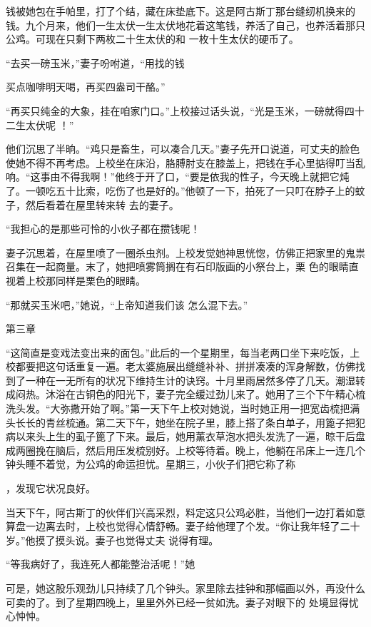 \documentclass{article}
\begin{document}
钱被她包在手帕里，打了个结，藏在床垫底下。这是阿古斯丁那台缝纫机换来的钱。九个月来，他们一生太伏一生太伏地花着这笔钱，养活了自己，也养活着那只公鸡。可现在只剩下两枚二十生太伏的和
一枚十生太伏的硬币了。 

“去买一磅玉米，”妻子吩咐道，“用找的钱

\newpage
买点咖啡明天喝，再买四盎司干酪。” 

“再买只纯金的大象，挂在咱家门口。”上校接过话头说，“光是玉米，一磅就得四十二生太伏呢
！” 

他们沉思了半晌。“鸡只是畜生，可以凑合几天。”妻子先开口说道，可丈夫的脸色使她不得不再考虑。上校坐在床沿，胳膊肘支在膝盖上，把钱在手心里掂得叮当乱响。“这事由不得我啊！”他终于开了口，“要是依我的性子，今天晚上就把它炖了。一顿吃五十比索，吃伤了也是好的。”他顿了一下，拍死了一只叮在脖子上的蚊子，然后看着在屋里转来转
去的妻子。 

“我担心的是那些可怜的小伙子都在攒钱呢！

妻子沉思着，在屋里喷了一圈杀虫剂。上校发觉她神思恍惚，仿佛正把家里的鬼祟召集在一起商量。末了，她把喷雾筒搁在有石印版画的小祭台上，栗
色的眼睛直视着上校那同样是栗色的眼睛。 

\newpage

“那就买玉米吧，”她说，“上帝知道我们该
怎么混下去。” 



第三章 

“这简直是变戏法变出来的面包。”此后的一个星期里，每当老两口坐下来吃饭，上校都要把这句话重复一遍。老太婆施展出缝缝补补、拼拼凑凑的浑身解数，仿佛找到了一种在一无所有的状况下维持生计的诀窍。十月里雨居然多停了几天。潮湿转成闷热。沐浴在古铜色的阳光下，妻子完全缓过劲儿来了。她用了三个下午精心梳洗头发。“大弥撒开始了啊。”第一天下午上校对她说，当时她正用一把宽齿梳把满头长长的青丝梳通。第二天下午，她坐在院子里，膝上搭了条白单子，用篦子把犯病以来头上生的虱子篦了下来。最后，她用薰衣草泡水把头发洗了一遍，晾干后盘成两圈挽在脑后，然后用压发梳别好。上校等待着。晚上，他躺在吊床上一连几个钟头睡不着觉，为公鸡的命运担忧。星期三，小伙子们把它称了称

\newpage
，发现它状况良好。 

当天下午，阿古斯丁的伙伴们兴高采烈，料定这只公鸡必胜，当他们一边打着如意算盘一边离去时，上校也觉得心情舒畅。妻子给他理了个发。“你让我年轻了二十岁。”他摸了摸头说。妻子也觉得丈夫
说得有理。 

“等我病好了，我连死人都能整治活呢！”她

可是，她这股乐观劲儿只持续了几个钟头。家里除去挂钟和那幅画以外，再没什么可卖的了。到了星期四晚上，里里外外已经一贫如洗。妻子对眼下的
处境显得忧心忡忡。 
\end{document}
